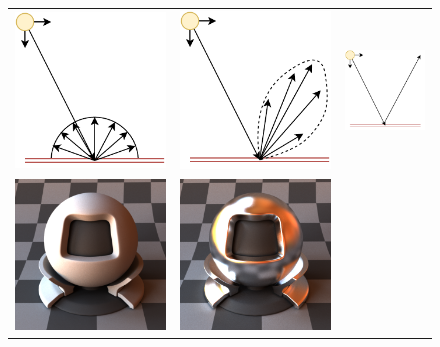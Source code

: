 \begin{figure}[httpb]
	\begin{tabular}{ccc}
		\includegraphics[width=.3\linewidth]{img/brdf_diffuse_diag.pdf}
		&
		\includegraphics[width=.3\linewidth]{img/brdf_glossy_diag.pdf}
		&
		\includegraphics[width=.3\linewidth]{img/brdf_mirror_diag.pdf} \\
		\includegraphics[width=.3\linewidth]{img/brdf_diffuse.png}
		&
		\includegraphics[width=.3\linewidth]{img/brdf_glossy.png}

\end{tabular}
\end{figure}
